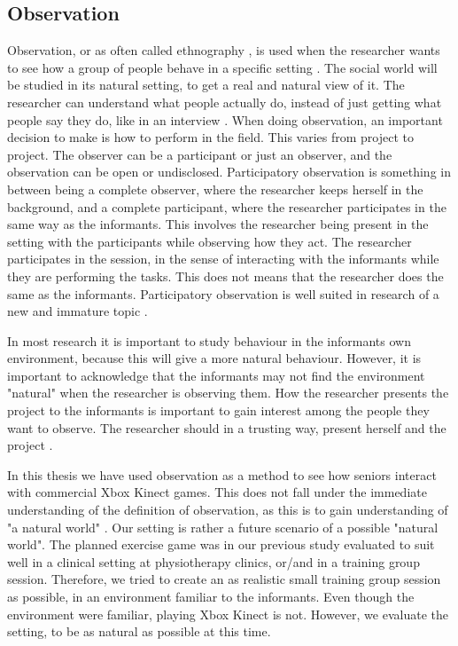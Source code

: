 \subsection{Observation}
\label{subsec:observation}
Observation, or as often called ethnography \cite{tjora}, is used when the researcher wants to see how a group of people behave in a specific setting \cite{qualitative}. The social world will be studied in its natural setting, to get a real and natural view of it. The researcher can understand what people actually do, instead of just getting what people say they do, like in an interview \cite{tjora}. When doing observation, an important decision to make is how to perform in the field. This varies from project to project. The observer can be a participant or just an observer, and the observation can be open or undisclosed. Participatory observation is something in between being a complete observer, where the researcher keeps herself in the background, and a complete participant, where the researcher participates in the same way as the informants. This involves the researcher being present in the setting with the participants while observing how they act. The researcher participates in the session, in the sense of interacting with the informants while they are performing the tasks. This does not means that the researcher does the same as the informants. Participatory observation is well suited in research of a new and immature topic \cite{qualitative}.

In most research it is important to study behaviour in the informants own environment, because this will give a more natural behaviour. However, it is important to acknowledge that the informants may not find the environment "natural" when the researcher is observing them. How the researcher presents the project to the informants is important to gain interest among the people they want to observe. The researcher should in a trusting way, present herself and the project \cite{qualitative}.

In this thesis we have used observation as a method to see how seniors interact with commercial Xbox Kinect games. This does not fall under the immediate understanding of the definition of observation, as this is to gain understanding of "a natural world" \cite{tjora}. Our setting is rather a future scenario of a possible "natural world". The planned exercise game was in our previous study \cite{project} evaluated to suit well in a clinical setting at physiotherapy clinics, or/and in a training group session. Therefore, we tried to create an as realistic small training group session as possible, in an environment familiar to the informants. Even though the environment were familiar, playing Xbox Kinect is not. However, we evaluate the setting, to be as natural as possible at this time. 

